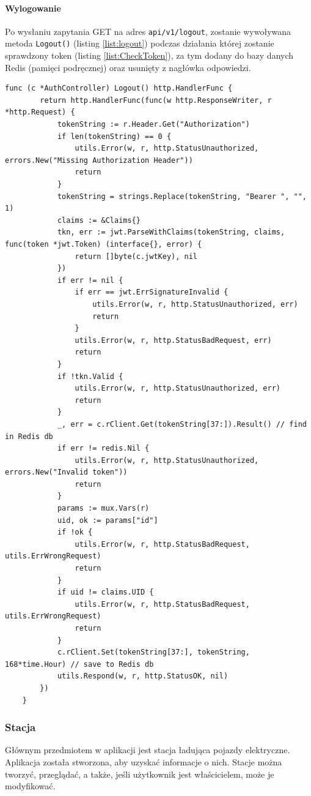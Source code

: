 \paragraph{Wylogowanie\newline}
Po wysłaniu zapytania GET na adres \texttt{api/v1/logout}, zostanie wywoływana metoda \texttt{Logout()} (listing \ref{list:logout}) podczas działania której zostanie sprawdzony token (listing \ref{list:CheckToken}), za tym dodany do bazy danych Redis (pamięci podręcznej) oraz usunięty z nagłówka odpowiedzi.
\begin{lstlisting}[label=list:logout,caption=Wylogowanie,basicstyle=\tiny\ttfamily]
    func (c *AuthController) Logout() http.HandlerFunc {
        return http.HandlerFunc(func(w http.ResponseWriter, r *http.Request) {
            tokenString := r.Header.Get("Authorization")
            if len(tokenString) == 0 {
                utils.Error(w, r, http.StatusUnauthorized, errors.New("Missing Authorization Header"))
                return
            }
            tokenString = strings.Replace(tokenString, "Bearer ", "", 1)
            claims := &Claims{}
            tkn, err := jwt.ParseWithClaims(tokenString, claims, func(token *jwt.Token) (interface{}, error) {
                return []byte(c.jwtKey), nil
            })
            if err != nil {
                if err == jwt.ErrSignatureInvalid {
                    utils.Error(w, r, http.StatusUnauthorized, err)
                    return
                }
                utils.Error(w, r, http.StatusBadRequest, err)
                return
            }
            if !tkn.Valid {
                utils.Error(w, r, http.StatusUnauthorized, err)
                return
            }
            _, err = c.rClient.Get(tokenString[37:]).Result() // find in Redis db
            if err != redis.Nil {
                utils.Error(w, r, http.StatusUnauthorized, errors.New("Invalid token"))
                return
            }
            params := mux.Vars(r)
            uid, ok := params["id"]
            if !ok {
                utils.Error(w, r, http.StatusBadRequest, utils.ErrWrongRequest)
                return
            }
            if uid != claims.UID {
                utils.Error(w, r, http.StatusBadRequest, utils.ErrWrongRequest)
                return
            }
            c.rClient.Set(tokenString[37:], tokenString, 168*time.Hour) // save to Redis db
            utils.Respond(w, r, http.StatusOK, nil)
        })
    }
\end{lstlisting}

\subsubsection{Stacja}
Głównym przedmiotem w aplikacji jest stacja ładująca pojazdy elektryczne. Aplikacja została stworzona, aby uzyskać informacje o nich. Stacje można tworzyć, przeglądać, a także, jeśli użytkownik jest właścicielem, może je modyfikować.

